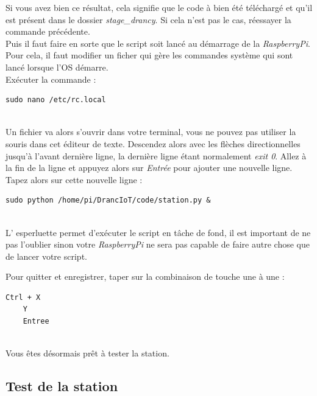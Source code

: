 Si vous avez bien ce résultat, cela signifie que le code à bien été téléchargé et qu'il est présent dans le dossier \textit{stage_drancy}. Si cela n'est pas le cas, réessayer la commande précédente.\\

Puis il faut faire en sorte que le script soit lancé au démarrage de la \textit{RaspberryPi}. Pour cela, il faut modifier un ficher qui gère les commandes système qui sont lancé lorsque l'OS démarre.\\

Exécuter la commande : \\

\begin{lstlisting}[style=MyBashStyle]
	sudo nano /etc/rc.local
\end{lstlisting}\\

Un fichier va alors s'ouvrir dans votre terminal, vous ne pouvez pas utiliser la souris dans cet éditeur de texte. Descendez alors avec les flèches directionnelles jusqu'à l'avant dernière ligne, la dernière ligne étant normalement \textit{exit 0}. Allez à la fin de la ligne et appuyez alors sur \textit{Entrée} pour ajouter une nouvelle ligne. 
\\
Tapez alors sur cette nouvelle ligne :\\

\begin{lstlisting}[style=MyBashStyle]
	sudo python /home/pi/DrancIoT/code/station.py &
\end{lstlisting}\\

L' esperluette permet d'exécuter le script en tâche de fond, il est important de ne pas l'oublier sinon votre \textit{RaspberryPi} ne sera pas capable de faire autre chose que de lancer votre script.

Pour quitter et enregistrer, taper sur la combinaison de touche une à une :\\

\begin{lstlisting}[style=MyBashStyle]
	Ctrl + X
	Y
	Entree
\end{lstlisting}\\

Vous êtes désormais prêt à tester la station.

\subsection{Test de la station}\\

